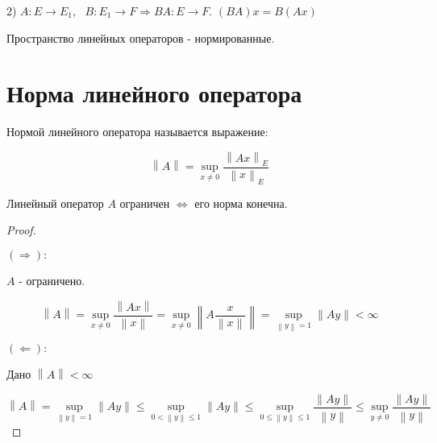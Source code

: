 \documentclass[12pt, a4paper]{report}
\begin{document}
2) \( A : E \to  E_1 , \text{ }  B : E_1 \to  F \Rightarrow   BA : E \to  F  \). \( (BA )x = B (A x ) \) 

Пространство линейных операторов - нормированные. 

\section{Норма линейного оператора}

\begin{definition}
     Нормой линейного оператора называется выражение: 

     \[ \left\lVert A  \right\rVert = \sup_{x \neq 0 } \frac{\left\lVert A x  \right\rVert _E }{\left\lVert  x  \right\rVert _ E }  \] 
\end{definition}

\begin{theorem}
    Линейный оператор \( A \) ограничен \( \Leftrightarrow   \) его норма конечна.
\end{theorem}

\begin{proof} \(  \) 

    \begin{flushleft}
        \( (\Rightarrow ):  \) 
    \end{flushleft}

    \( A  \) - ограничено. 

    \[ \left\lVert  A  \right\rVert = \sup _{x \neq 0 } \frac{\left\lVert  A x  \right\rVert}{\left\lVert  x  \right\rVert} = \sup _{x \neq 0 } \left\lVert A \frac{x }{\left\lVert  x  \right\rVert}  \right\rVert = \sup _{\left\lVert y  \right\rVert = 1 } \left\lVert  A y  \right\rVert < \infty      \] 

    \begin{flushleft}
        \( (\Leftarrow ):  \) 
    \end{flushleft}

    Дано \( \left\lVert  A  \right\rVert  < \infty \) 

    \[ \left\lVert  A  \right\rVert = \sup _{\left\lVert  y  \right\rVert = 1 } \left\lVert  A y  \right\rVert \le  \sup_{0 < \left\lVert y  \right\rVert \le 1         } \left\lVert  A y  \right\rVert \le \sup _{0 \le \left\lVert  y  \right\rVert \le 1 } \frac{\left\lVert  A y  \right\rVert}{\left\lVert  y  \right\rVert} \le \sup _{y \neq 0 }  \frac{ \left\lVert  A y  \right\rVert}{\left\lVert y \right\rVert}       \]  
\end{proof}
\end{document}
